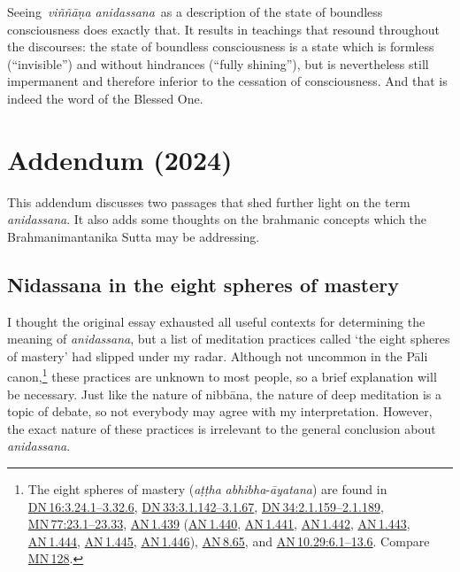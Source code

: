 \documentclass[10pt, openany]{book}
\begin{document}
Seeing \textit{viññāṇa anidassana} as a description of the state of boundless consciousness does exactly that. It results in teachings that resound throughout the discourses: the state of boundless consciousness is a state which is formless (“invisible”) and without hindrances (“fully shining”), but is nevertheless still impermanent and therefore inferior to the cessation of consciousness. And that is indeed the word of the Blessed One.


\chapter{Addendum (2024)}
This addendum discusses two passages that shed further light on the term \textit{anidassana}. It also adds some thoughts on the brahmanic concepts which the Brahmanimantanika Sutta may be addressing.




\section{Nidassana in the eight spheres of mastery}
I thought the original essay exhausted all useful contexts for determining the meaning of \textit{anidassana}, but a list of meditation practices called ‘the eight spheres of mastery’ had slipped under my radar. Although not uncommon in the Pāli canon,\footnote {The eight spheres of mastery (\textit{aṭṭha} \textit{abhibha}-\textit{āyatana}) are found in \href{https://suttacentral.net/dn16/en/sujato\#3.24.1}{DN 16:3.24.1–3.32.6}, \href{https://suttacentral.net/dn33/en/sujato\#3.1.142}{DN 33:3.1.142–3.1.67}, \href{https://suttacentral.net/dn34/en/sujato\#2.1.159}{DN 34:2.1.159–2.1.189}, \href{https://suttacentral.net/mn77/en/sujato\#23.1}{MN 77:23.1–23.33}, \href{https://suttacentral.net/an1.439/en/sujato}{AN 1.439} (\href{https://suttacentral.net/an1.440/en/sujato}{AN 1.440}, \href{https://suttacentral.net/an1.441/en/sujato}{AN 1.441}, \href{https://suttacentral.net/an1.442/en/sujato}{AN 1.442}, \href{https://suttacentral.net/an1.443/en/sujato}{AN 1.443}, \href{https://suttacentral.net/an1.444/en/sujato}{AN 1.444}, \href{https://suttacentral.net/an1.445/en/sujato}{AN 1.445}, \href{https://suttacentral.net/an1.446/en/sujato}{AN 1.446}), \href{https://suttacentral.net/an8.65/en/sujato}{AN 8.65}, and \href{https://suttacentral.net/an10.29/en/sujato\#6.1}{AN 10.29:6.1–13.6}. Compare \href{https://suttacentral.net/mn128/en/sujato}{MN 128}.} these practices are unknown to most people, so a brief explanation will be necessary. Just like the nature of nibbāna, the nature of deep meditation is a topic of debate, so not everybody may agree with my interpretation. However, the exact nature of these practices is irrelevant to the general conclusion about \textit{anidassana}.
\end{document}
